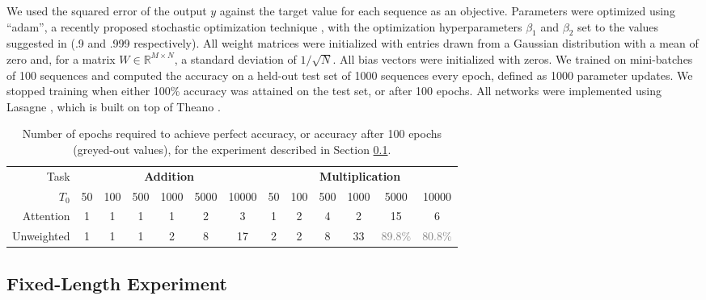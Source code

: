 \documentclass{article} %
\begin{document}
We used the squared error of the output $y$ against the target value for each sequence as an objective.
Parameters were optimized using ``adam'', a recently proposed stochastic optimization technique \cite{kingma2014adam}, with the optimization hyperparameters $\beta_1$ and $\beta_2$ set to the values suggested in \cite{kingma2014adam} (.9 and .999 respectively).
All weight matrices were initialized with entries drawn from a Gaussian distribution with a mean of zero and, for a matrix $W \in \mathbb{R}^{M \times N}$, a standard deviation of $1/\sqrt{N}$.
All bias vectors were initialized with zeros.
We trained on mini-batches of 100 sequences and computed the accuracy on a held-out test set of 1000 sequences every epoch, defined as 1000 parameter updates.
We stopped training when either 100\% accuracy was attained on the test set, or after 100 epochs.
All networks were implemented using Lasagne \cite{dieleman2015lasagne}, which is built on top of Theano \cite{bastien2012theano,bergstra2010theano}.

\begin{table}
  \centering
  \footnotesize
  \begin{tabular}{r c c c c c c c c c c c c}
    \toprule
    Task & \multicolumn{6}{c}{\textbf{Addition}} & \multicolumn{6}{c}{\textbf{Multiplication}} \\
    $T_0$ & 50 & 100 & 500 & 1000 & 5000 & 10000 & 50 & 100 & 500 & 1000 & 5000 & 10000 \\
    \cmidrule(r){2-7}
    \cmidrule(r){8-13}
    Attention & 1 & 1 & 1 & 1 & 2 & 3 & 1 & 2 & 4 & 2 & 15 & 6 \\
    Unweighted & 1 & 1 & 1 & 2 & 8 & 17 & 2 & 2 & 8 & 33 & \textcolor{gray}{89.8\%} & \textcolor{gray}{80.8\%} \\
    \bottomrule
  \end{tabular}
  \caption{Number of epochs required to achieve perfect accuracy, or accuracy after 100 epochs (greyed-out values), for the experiment described in Section \ref{sec:fixed}.}
  \label{tab:fixed}
\end{table}

\subsection{Fixed-Length Experiment}
\label{sec:fixed}
\end{document}
